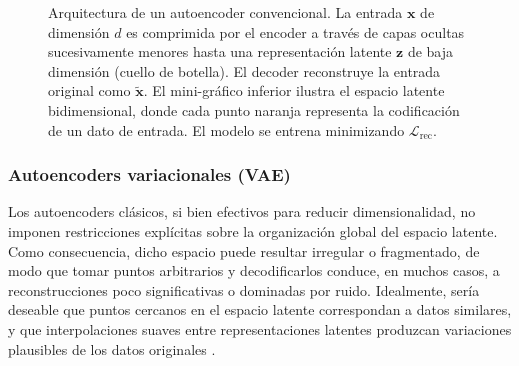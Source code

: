 \begin{figure}[H]
\shorthandon{>}
\caption{Arquitectura de un autoencoder convencional. La entrada $\mathbf{x}$ de dimensión $d$ es comprimida por el encoder a trav\'es de capas ocultas sucesivamente menores hasta una representación latente $\mathbf{z}$ de baja dimensión (cuello de botella). El decoder reconstruye la entrada original como $\tilde{\mathbf{x}}$. El mini-gráfico inferior ilustra el espacio latente bidimensional, donde cada punto naranja representa la codificación de un dato de entrada. El modelo se entrena minimizando $\mathcal{L}_{\text{rec}}$.}
\label{fig:ae_arch}
\end{figure}

\subsubsection{Autoencoders variacionales (VAE)}

Los autoencoders clásicos, si bien efectivos para reducir dimensionalidad, no imponen restricciones explícitas sobre la organización global del espacio latente. Como consecuencia, dicho espacio puede resultar irregular o fragmentado, de modo que tomar puntos arbitrarios y decodificarlos conduce, en muchos casos, a reconstrucciones poco significativas o dominadas por ruido. Idealmente, sería deseable que puntos cercanos en el espacio latente correspondan a datos similares, y que interpolaciones suaves entre representaciones latentes produzcan variaciones plausibles de los datos originales \cite{doersch2016tutorial}.

